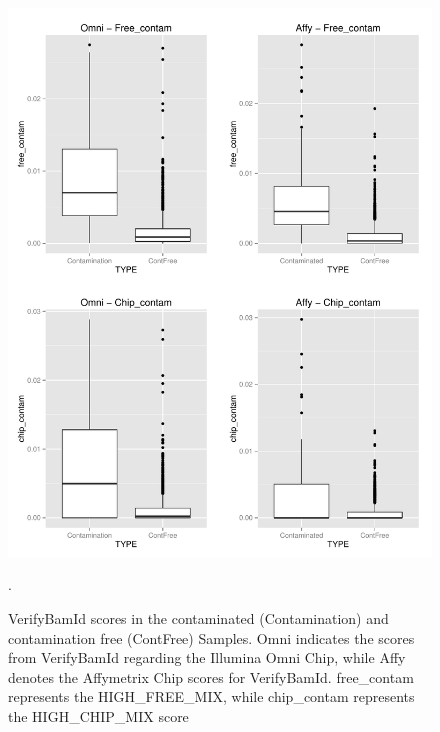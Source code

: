 \begin{itemize}
\begin{figure}[!ht]
\label{contScores}
    \centering
    \includegraphics[width=1\textwidth]{images/Result-VerifyBamId-check.pdf}
    \caption[VerifyBamId scores in the contaminated (Contamination) and contamination free (ContFree) Samples]{VerifyBamId scores in the contaminated (Contamination) and contamination free (ContFree) Samples. Omni indicates the scores from VerifyBamId regarding the Illumina Omni Chip, while Affy denotes the Affymetrix Chip scores for VerifyBamId. free\_contam represents the HIGH\_FREE\_MIX, while chip\_contam represents the HIGH\_CHIP\_MIX score}.  
    \label{cont:1000G}
\end{figure}
\end{itemize}

